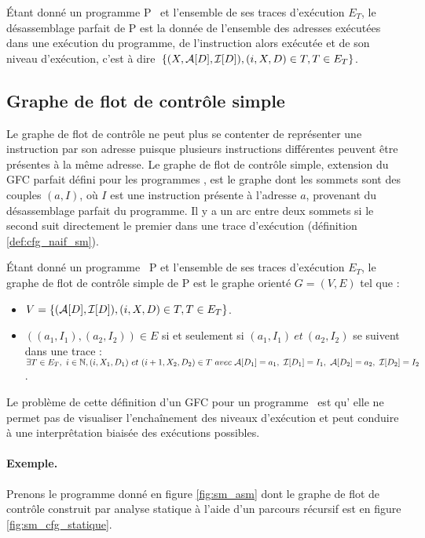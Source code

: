 \begin{defi}
 Étant donné un programme P \sm\ et l'ensemble de ses traces d'exécution
$E_T$, le désassemblage parfait de P est la donnée de l'ensemble des adresses exécutées dans une exécution du programme, de l'instruction alors exécutée et de son niveau d'exécution, c'est à dire~$\{(X, \mathcal A[D], \mathcal I[D]), (i, X, D)\in T, T\in E_T\}$.
\label{def:desassemblage_parfait_sm2}
\end{defi}

\subsection{Graphe de flot de contrôle simple}
Le graphe de flot de contrôle ne peut plus se contenter de représenter
une instruction par son adresse puisque plusieurs instructions
différentes peuvent être présentes à la même adresse.
Le graphe de flot de contrôle simple, extension du GFC parfait défini pour les programmes \nsms, est le graphe dont les sommets sont des couples $(a, I)$, où $I$ est une instruction présente à l'adresse $a$, provenant du désassemblage parfait du programme. Il y a un arc entre deux sommets si le second suit directement le premier dans une trace d'exécution (définition \ref{def:cfg_naif_sm}).

\begin{defi}
 Étant donné un programme \sm\ P et l'ensemble de ses traces d'exécution
$E_T$, le graphe de flot de contrôle simple de P est le graphe orienté
$G=(V, E)$ tel que :

 \begin{itemize}
  \item $V=\{(\mathcal A[D], \mathcal I[D]), (i, X, D)\in T, T\in E_T\}$.
  \item $((a_1, I_1), (a_2, I_2))\in E$ si et seulement si $(a_1,
I_1)\ et\ (a_2, I_2)$ se suivent dans une trace : $\exists T\in
E_T,\ i\in \BN, (i, X_1, D_1)\ et\ (i+1, X_2, D_2)\in T\ avec\
\mda{D_1}=a_1,\ \mdi{D_1}=I_1,~\mda{D_2}=a_2,\ \mdi{D_2}=I_2$.
 \end{itemize}
\label{def:cfg_naif_sm}
\end{defi}

Le problème de cette définition d'un GFC pour un programme \sm\ est qu'%
elle ne permet pas de visualiser l'enchaînement des niveaux d'exécution et peut conduire à une interprêtation biaisée des exécutions possibles.

\paragraph{Exemple.}
Prenons le programme donné en figure \ref{fig:sm_asm} dont le graphe de flot de contrôle construit par analyse statique à l'aide d'un parcours récursif est en figure \ref{fig:sm_cfg_statique}.

